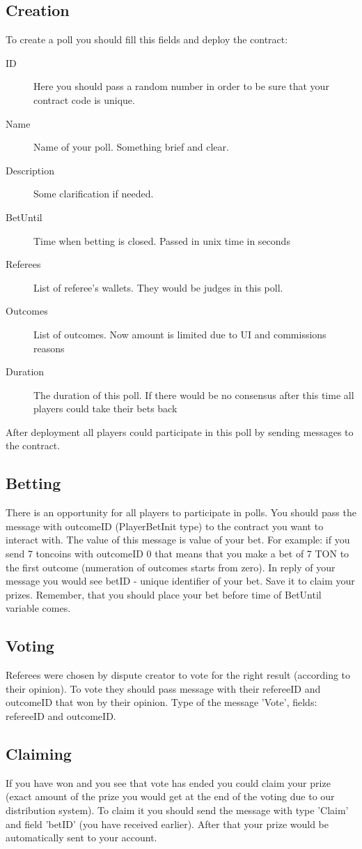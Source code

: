 \documentclass [12pt] {article}
\newcounter {note}
\newcommand {\Note} [1] {
	\marginpar {
		\tiny {
			{\color{tealgreen}{\thenote  \  #1}}
		}
	}
	\stepcounter {note}
}
\begin{document}
	\subsection{Creation}	
	To create a poll you should fill this fields and deploy the contract:
	\begin{description}
		\item[ID]{Here you should pass a random number in order to be sure that your contract code is unique.}
		\item[Name]{Name of your poll. Something brief and clear.}
		\item[Description]{Some clarification if needed.}
		\item[BetUntil]{Time when betting is closed. Passed in unix time in seconds}
		\item[Referees]{List of referee's wallets. They would be judges in this poll.}
		\item[Outcomes]{List of outcomes. Now amount is limited due to UI and commissions reasons}
		\item[Duration]{The duration of this poll. If there would be no consensus after this time all players could take their bets back}
	\end{description}
	After deployment all players could participate in this poll by sending messages to the contract.
	\subsection{Betting}
	There is an opportunity for all players to participate in polls. You should pass the message with outcomeID (PlayerBetInit type) to the contract you want to interact with. The value of this message is value of your bet. For example: if you send 7 toncoins with outcomeID 0 that means that you make a bet of 7 TON to the first outcome (numeration of outcomes starts from zero).
	In reply of your message you would see betID - unique identifier of your bet. Save it to claim your prizes. Remember, that you should place your bet before time of BetUntil variable comes.
	\subsection{Voting}
	Referees were chosen by dispute creator to vote for the right result (according to their opinion). To vote they should pass message with their refereeID and outcomeID that won by their opinion. Type of the message 'Vote', fields: refereeID and outcomeID.
	
	\subsection{Claiming}
	If you have won and you see that vote has ended you could claim your prize (exact amount of the prize you would get at the end of the voting due to our distribution system). To claim it you should send the message with type 'Claim' and field 'betID' (you have received earlier). After that your prize would be automatically sent to your account.
	
\end{document}

